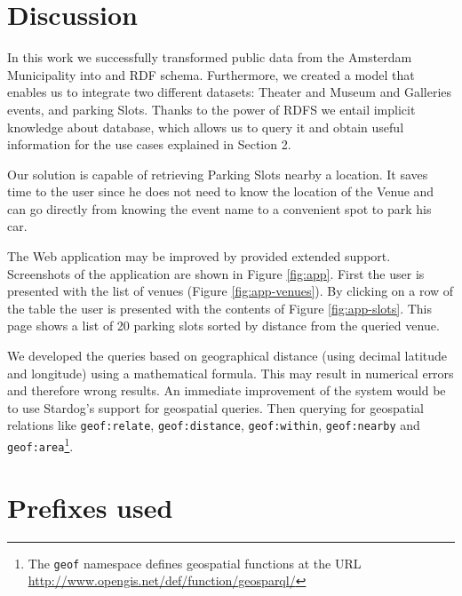 \documentclass[runningheads,a4paper]{../../StyleFiles/llncs}
\begin{document}
\section{Discussion}
In this work we successfully transformed public data from the Amsterdam Municipality into and RDF schema. Furthermore, we created a model that enables us to integrate two different datasets: Theater and Museum and Galleries events, and parking Slots. Thanks to the power of RDFS we entail implicit knowledge about database, which allows us to query it and obtain useful information for the use cases explained in Section 2. 

Our solution is capable of retrieving Parking Slots nearby a location. It saves time to the user since he does not need to know the location of the Venue and can go directly from knowing the event name to a convenient spot to park his car. 

The Web application may be improved by provided extended support. Screenshots of
the application are shown in Figure \ref{fig:app}. First the user is presented with
the list of venues (Figure \ref{fig:app-venues}). By clicking on a row of the table
the user is presented with the contents of Figure \ref{fig:app-slots}. This page
shows a list of 20 parking slots sorted by distance from the queried venue.

We developed the queries based on geographical distance (using decimal latitude
and longitude) using a mathematical formula. This may result in numerical errors
and therefore wrong results. An immediate improvement of the system would be to
use Stardog's support for geospatial queries. Then querying for geospatial
relations like \texttt{geof:relate}, \texttt{geof:distance},
\texttt{geof:within}, \texttt{geof:nearby} and
\texttt{geof:area}\footnote{The \texttt{geof} namespace defines geospatial
functions at the URL \url{http://www.opengis.net/def/function/geosparql/}}.





\newpage
\appendix
\section{Prefixes used}
\end{document}
